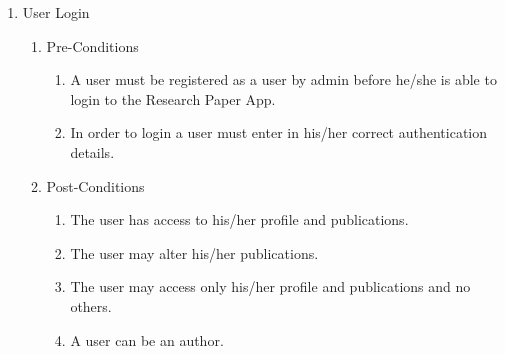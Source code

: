 \documentclass{article} %
\begin{document}
	\begin{enumerate}
		\item  User Login
		
		\begin{enumerate}
			\item  Pre-Conditions
			
			\begin{enumerate}
				\item  A user must be registered as a user by admin before he/she is able to login to the Research Paper App.
				
				\item  In order to login a user must enter in his/her correct authentication details.
			\end{enumerate}
			
			\item  Post-Conditions
			
			\begin{enumerate}
				\item  The user has access to his/her profile and publications.
				
				\item  The user may alter his/her publications.
				
				\item  The user may access only his/her profile and publications and no others.
				
				\item  A user can be an author.
			\end{enumerate}
		\end{enumerate}
	\end{enumerate}
	
	\noindent 
	
\end{document}
